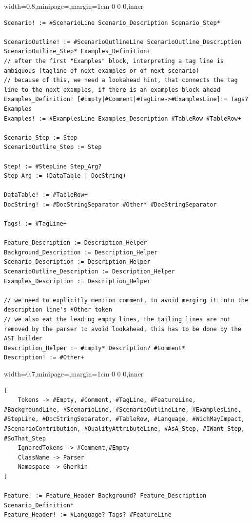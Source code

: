 \documentclass[dissertation,final]{softeng}
\newenvironment{featurecode}[1]
{ \lrbox\featurebox \begin{adjustbox}{width=#1\textwidth,minipage=\textwidth,margin=1cm 0 0 0,inner} }
{ \end{adjustbox}\endlrbox}
\newenvironment{featurelist}[2]
{
\newcommand{\setcaption}{\caption{#1}}
\newcommand{\setlabel}{\label{#2}}
}
{\begin{listing}[h!]\centering\usebox\featurebox\setcaption\setlabel\end{listing}}
\begin{document}
\begin{appendices}
\begin{featurelist}{Original gherkin grammar}{lst:original_gherkin_grammar}
\begin{featurecode}{0.8}
\begin{verbatim}
Scenario! := #ScenarioLine Scenario_Description Scenario_Step*

ScenarioOutline! := #ScenarioOutlineLine ScenarioOutline_Description ScenarioOutline_Step* Examples_Definition+
// after the first "Examples" block, interpreting a tag line is ambiguous (tagline of next examples or of next scenario)
// because of this, we need a lookahead hint, that connects the tag line to the next examples, if there is an examples block ahead
Examples_Definition! [#Empty|#Comment|#TagLine->#ExamplesLine]:= Tags? Examples
Examples! := #ExamplesLine Examples_Description #TableRow #TableRow+

Scenario_Step := Step
ScenarioOutline_Step := Step

Step! := #StepLine Step_Arg?
Step_Arg := (DataTable | DocString)

DataTable! := #TableRow+
DocString! := #DocStringSeparator #Other* #DocStringSeparator

Tags! := #TagLine+

Feature_Description := Description_Helper
Background_Description := Description_Helper
Scenario_Description := Description_Helper
ScenarioOutline_Description := Description_Helper
Examples_Description := Description_Helper

// we need to explicitly mention comment, to avoid merging it into the description line's #Other token
// we also eat the leading empty lines, the tailing lines are not removed by the parser to avoid lookahead, this has to be done by the AST builder
Description_Helper := #Empty* Description? #Comment*
Description! := #Other+
\end{verbatim}
\end{featurecode}
\end{featurelist}
\begin{featurelist}{Updated gherkin grammar}{lst:updated_gherkin_grammar}
\begin{featurecode}{0.7}
\begin{verbatim}
[
	Tokens -> #Empty, #Comment, #TagLine, #FeatureLine, #BackgroundLine, #ScenarioLine, #ScenarioOutlineLine, #ExamplesLine, #StepLine, #DocStringSeparator, #TableRow, #Language, #WichMayImpact, #ScenarioContribution, #QualityAttributeLine, #AsA_Step, #IWant_Step, #SoThat_Step 
	IgnoredTokens -> #Comment,#Empty
	ClassName -> Parser
	Namespace -> Gherkin
]

Feature! := Feature_Header Background? Feature_Description Scenario_Definition*
Feature_Header! := #Language? Tags? #FeatureLine


\end{verbatim}
\end{featurecode}
\end{featurelist}
\end{appendices}
\end{document}
